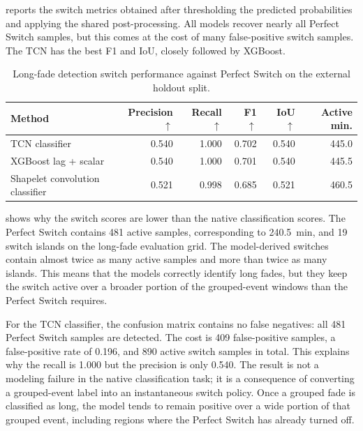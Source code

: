  reports the switch metrics obtained after
thresholding the predicted probabilities and applying the shared
post-processing. All models recover nearly all Perfect Switch samples, but this
comes at the cost of many false-positive switch samples. The TCN has the best
F1 and IoU, closely followed by XGBoost.

\begin{table}[htbp]
  \centering
  \caption{Long-fade detection switch performance against Perfect Switch on the external holdout split.}
  \label{tab:long-fade-switch-results}
  \small
  \setlength{\tabcolsep}{5pt}
  \renewcommand{\arraystretch}{1.15}
  \begin{tabular}{
    @{}
    >{\raggedright\arraybackslash}p{}
    rrrrr
    @{}
  }
    \toprule
    Method & Precision \(\uparrow\) & Recall \(\uparrow\) & F1 \(\uparrow\) & IoU \(\uparrow\) & Active min. \\
    \midrule
    TCN classifier & 0.540 & 1.000 & 0.702 & 0.540 & 445.0 \\
    XGBoost lag + scalar & 0.540 & 1.000 & 0.701 & 0.540 & 445.5 \\
    Shapelet convolution classifier & 0.521 & 0.998 & 0.685 & 0.521 & 460.5 \\
    \bottomrule
  \end{tabular}
\end{table}

 shows why the switch scores are
lower than the native classification scores. The Perfect Switch contains 481
active samples, corresponding to \SI{240.5}{min}, and 19 switch islands on the
long-fade evaluation grid. The model-derived switches contain almost twice as
many active samples and more than twice as many islands. This means that the
models correctly identify long fades, but they keep the switch active over a
broader portion of the grouped-event windows than the Perfect Switch requires.

For the TCN classifier, the confusion matrix contains no false negatives: all
481 Perfect Switch samples are detected. The cost is 409 false-positive
samples, a false-positive rate of 0.196, and 890 active switch samples in
total. This explains why the recall is 1.000 but the precision is only 0.540.
The result is not a modeling failure in the native classification task; it is
a consequence of converting a grouped-event label into an instantaneous switch
policy. Once a grouped fade is classified as long, the model tends to remain
positive over a wide portion of that grouped event, including regions where the
Perfect Switch has already turned off.

